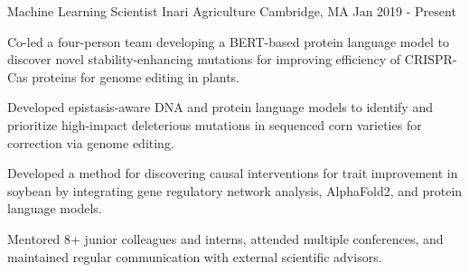 

\begin{cventries}

  \cventry
    {Machine Learning Scientist} %
    {Inari Agriculture} %
    {Cambridge, MA} %
    {Jan 2019 - Present} %
    {
      \begin{cvitems} %
        \item {Co-led a four-person team developing a BERT-based protein language model to discover novel stability-enhancing mutations for improving efficiency of CRISPR-Cas proteins for genome editing in plants.}
        \item {Developed epistasis-aware DNA and protein language models to identify and prioritize high-impact deleterious mutations in sequenced corn varieties for correction via genome editing.}
        \item {Developed a method for discovering causal interventions for trait improvement in soybean by integrating gene regulatory network analysis, AlphaFold2, and protein language models.}
        \item {Mentored 8+ junior colleagues and interns, attended multiple conferences, and maintained regular communication with external scientific advisors.}
      \end{cvitems}
    }


\end{cventries}
